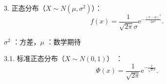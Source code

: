 3. 正态分布（$X\sim N\left( \mu,\sigma^{2} \right) $）：\[
    f\left( x \right) =\frac{1}{\sqrt{2\pi} \sigma}\text{e}^{-\frac{\left( x-\mu \right) ^{2}}{2\sigma^{2}}}
.\] 

\begin{notation}
    $\sigma^{2}$ ：方差，$\mu$ ：数学期待
\end{notation}

3.1. 标准正态分布（$X\sim N\left( 0,1 \right) $） ：\[
\Phi\left( x \right) =\frac{1}{\sqrt{2\pi}} \text{e}^{-\frac{x}{\sqrt{2} \sigma}}
.\] 
